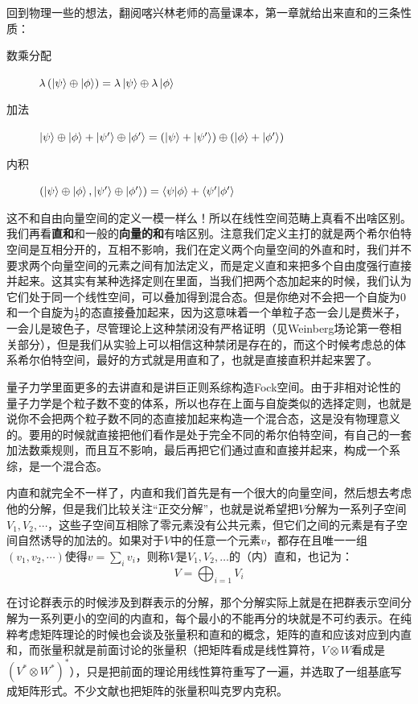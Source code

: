 回到物理一些的想法，翻阅喀兴林老师的高量课本，第一章就给出来直和的三条性质：
\begin{description}
	\item[数乘分配]$\lambda \left(\ket{\psi}\oplus\ket{\phi}\right)=\lambda\ket{\psi}\oplus\lambda\ket{\phi}$
	\item[加法] $\ket{\psi}\oplus\ket{\phi}+\ket{\psi^\prime}\oplus\ket{\phi^\prime}=\left(\ket{\psi}+\ket{\psi^\prime}\right)\oplus\left(\ket{\phi}+\ket{\phi^\prime}\right)$
	\item[内积]$\left(\ket{\psi}\oplus\ket{\phi},\ket{\psi^\prime}\oplus\ket{\phi^\prime}\right)=\braket{\psi}{\phi}+\braket{\psi^\prime}{\phi^\prime}$
\end{description}
这不和自由向量空间的定义一模一样么！所以在线性空间范畴上真看不出啥区别。我们再看\textbf{直和}和一般的\textbf{向量的和}有啥区别。注意我们定义主打的就是两个希尔伯特空间是互相分开的，互相不影响，我们在定义两个向量空间的外直和时，我们并不要求两个向量空间的元素之间有加法定义，而是定义直和来把多个自由度强行直接并起来。这其实有某种选择定则在里面，当我们把两个态加起来的时候，我们认为它们处于同一个线性空间，可以叠加得到混合态。但是你绝对不会把一个自旋为0和一个自旋为$\frac12$的态直接叠加起来，因为这意味着一个单粒子态一会儿是费米子，一会儿是玻色子，尽管理论上这种禁闭没有严格证明（见Weinberg场论第一卷相关部分），但是我们从实验上可以相信这种禁闭是存在的，而这个时候考虑总的体系希尔伯特空间，最好的方式就是用直和了，也就是直接直积并起来罢了。

量子力学里面更多的去讲直和是讲巨正则系综构造Fock空间。由于非相对论性的量子力学是个粒子数不变的体系，所以也存在上面与自旋类似的选择定则，也就是说你不会把两个粒子数不同的态直接加起来构造一个混合态，这是没有物理意义的。要用的时候就直接把他们看作是处于完全不同的希尔伯特空间，有自己的一套加法数乘规则，而且互不影响，最后再把它们通过直和直接并起来，构成一个系综，是一个混合态。

内直和就完全不一样了，内直和我们首先是有一个很大的向量空间，然后想去考虑他的分解，但是我们比较关注“正交分解”，也就是说希望把$V$分解为一系列子空间$V_1,V_2,\cdots$，这些子空间互相除了零元素没有公共元素，但它们之间的元素是有子空间自然诱导的加法的。如果对于$V$中的任意一个元素$v$，都存在且唯一一组$(v_1,v_2,\cdots)$使得$v=\sum_i v_i$，则称$V$是$V_1,V_2,\ldots$的（内）直和，也记为：
\begin{equation}
	V=\bigoplus_{i=1} V_i
\end{equation}

在讨论群表示的时候涉及到群表示的分解，那个分解实际上就是在把群表示空间分解为一系列更小的空间的内直和，每个最小的不能再分的块就是不可约表示。在纯粹考虑矩阵理论的时候也会谈及张量积和直和的概念，矩阵的直和应该对应到内直和，而张量积就是前面讨论的张量积（把矩阵看成是线性算符，$V\otimes W$看成是$(V^*\otimes W^*)^*$），只是把前面的理论用线性算符重写了一遍，并选取了一组基底写成矩阵形式。不少文献也把矩阵的张量积叫克罗内克积。

